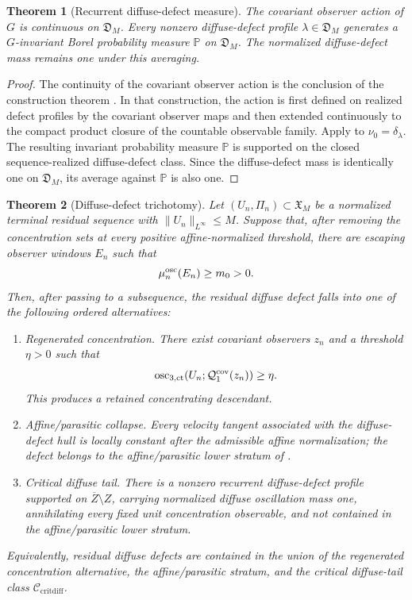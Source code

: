\documentclass[11pt]{amsart}
\numberwithin{equation}{section}
\theoremstyle{plain}
\newtheorem{theorem}{Theorem}[section]
\theoremstyle{definition}
\theoremstyle{remark}
\newcommand{\Ccritdiff}{\mathcal C_{\mathrm{critdiff}}}
\newcommand{\actthree}{\operatorname{osc}_{3,\mathrm{ct}}}
\begin{document}
\begin{theorem}[Recurrent diffuse-defect measure]
\label{thm:recurrent-diffuse-defect-measure}
The covariant observer action of \(G\) is continuous on \(\mathfrak D_M\).
Every nonzero diffuse-defect profile
\(\lambda\in\mathfrak D_M\) generates a \(G\)-invariant Borel probability
measure \(\mathbb P\) on \(\mathfrak D_M\).  The normalized diffuse-defect mass
remains one under this averaging.
\end{theorem}

\begin{proof}
The continuity of the covariant observer action is the conclusion of the
construction theorem
.  In that construction,
the action is first defined on realized defect profiles by the covariant
observer maps and then extended continuously to the compact product closure of
the countable observable family.
Apply  to
\(\nu_0=\delta_\lambda\).  The resulting invariant probability measure
\(\mathbb P\) is supported on the closed sequence-realized diffuse-defect class.
Since the diffuse-defect mass is identically one on \(\mathfrak D_M\), its
average against \(\mathbb P\) is also one.
\end{proof}

\begin{theorem}[Diffuse-defect trichotomy]
\label{thm:diffuse-defect-trichotomy}
Let \((U_n,\Pi_n)\subset\mathfrak X_M\) be a normalized terminal residual
sequence with \(\|U_n\|_{L^\infty}\le M\).  Suppose that, after removing the
concentration sets at every positive affine-normalized threshold, there are escaping
observer windows \(E_n\) such that
\[
   \mu_n^{\rm osc}(E_n)\ge m_0>0 .
\]
Then, after passing to a subsequence, the residual diffuse defect falls into
one of the following ordered alternatives:
\begin{enumerate}[label=\textup{D\arabic*.}]
   \item \emph{Regenerated concentration.}  There exist covariant observers \(z_n\)
   and a threshold \(\eta>0\) such that
   \[
      \actthree(U_n;\mathcal Q_1^{\rm cov}(z_n))\ge\eta .
   \]
   This produces a retained concentrating descendant.
   \item \emph{Affine/parasitic collapse.}  Every velocity tangent associated
   with the diffuse-defect hull is locally constant after the admissible affine
   normalization; the defect belongs to the affine/parasitic lower stratum of
   .
   \item \emph{Critical diffuse tail.}  There is a nonzero recurrent
   diffuse-defect profile supported on \(\overline Z\setminus Z\), carrying
   normalized diffuse oscillation mass one, annihilating every fixed unit
   concentration observable, and not contained in the affine/parasitic lower stratum.
\end{enumerate}
Equivalently, residual diffuse defects are contained in the union of the regenerated
concentration alternative, the affine/parasitic stratum, and the critical diffuse-tail
class \(\Ccritdiff\).
\end{theorem}
\end{document}
